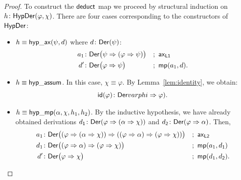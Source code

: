 \begin{proof}
    To construct the $\mathsf{deduct}$ map we proceed by structural induction on $h\colon\fun{HypDer}(\varphi, \chi)$. There are four cases corresponding to the constructors of $\mathsf{HypDer}$:
    \begin{itemize}
        \item $h\equiv\mathsf{hyp\_ax}(\psi,d)$ where $d\colon\fun{Der}(\psi)$:
        \begin{align*}
            a_1&\colon\fun{Der}\bigl(
                \psi\imp(\varphi\imp\psi)
            \bigr)
                &&;\ \fun{ax}_{\fun{L1}}\\
            d'&\colon\fun{Der}\bigl(\varphi\imp\psi\bigr)
                &&;\ \fun{mp}(a_1,d).
        \end{align*}
    
        \item $h\equiv\mathsf{hyp\_assum}$. In this case, $\chi\equiv\varphi$. By Lemma~\ref{lem:identity}, we obtain:
        \[
            \id(\varphi)\colon\fun{Der}varphi\imp\varphi).
        \]
    
        \item $h\equiv\mathsf{hyp\_mp}(\alpha,\chi,h_1,h_2)$. By the inductive hypothesis, we have already obtained derivations $d_{\fun{1}}\colon\fun{Der}(\varphi\imp(\alpha\imp\chi))$ and $d_{\fun{2}}\colon\fun{Der}(\varphi\imp\alpha)$. Then,
        \begin{align*}
            a_1&\colon\fun{Der}\bigl(
                (\varphi\imp(\alpha\imp\chi))
                \imp
                ((\varphi\imp\alpha)\imp(\varphi\imp\chi))
            \bigr)
                &&;\ \fun{ax}_{\fun{L2}}\\
            d_1&\colon\fun{Der}\bigl(
                (\varphi\imp\alpha)\imp(\varphi\imp\chi)
            \bigr)
                &&;\ \fun{mp}(a_1, d_{\fun{1}})\\
            d'&\colon\fun{Der}\bigl(
                \varphi\imp\chi
            \bigr)
                &&;\ \fun{mp}(d_1, d_{\fun{2}}).
        \end{align*}
    

\end{itemize}
\end{proof}
